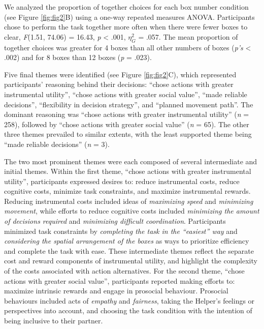 \documentclass[
  man,
  floatsintext,
  longtable,
  nolmodern,
  notxfonts,
  notimes,
  mask,
  colorlinks=true,linkcolor=blue,citecolor=blue,urlcolor=blue]{apa7}
\begin{document}
\clearpage

We analyzed the proportion of together choices for each box number
condition (see Figure \ref{fig:fig2}B) using a one-way repeated measures
ANOVA. Participants chose to perform the task together more often when
there were fewer boxes to clear, \emph{F}(1.51, 74.06) = 16.43, \emph{p}
\textless{} .001, \(\eta_{G}^{2}\) = .057. The mean proportion of
together choices was greater for 4 boxes than all other numbers of boxes
(\emph{p's} \textless{} .002) and for 8 boxes than 12 boxes (\emph{p} =
.023).

Five final themes were identified (see Figure \ref{fig:fig2}C), which
represented participants' reasoning behind their decisions: ``chose
actions with greater instrumental utility'', ``chose actions with
greater social value'', ``made reliable decisions'', ``flexibility in
decision strategy'', and ``planned movement path''. The dominant
reasoning was ``chose actions with greater instrumental utility''
(\emph{n} = 258), followed by ``chose actions with greater social
value'' (\emph{n} = 65). The other three themes prevailed to similar
extents, with the least supported theme being ``made reliable
decisions'' (\emph{n} = 3).

The two most prominent themes were each composed of several intermediate
and initial themes. Within the first theme, ``chose actions with greater
instrumental utility'', participants expressed desires to: reduce
instrumental costs, reduce cognitive costs, minimize task constraints,
and maximize instrumental rewards. Reducing instrumental costs included
ideas of \emph{maximizing speed} and \emph{minimizing movement}, while
efforts to reduce cognitive costs included \emph{minimizing the amount
of decisions required} and \emph{minimizing difficult coordination}.
Participants minimized task constraints by \emph{completing the task in
the ``easiest'' way} and \emph{considering the spatial arrangement of
the boxes} as ways to prioritize efficiency and complete the task with
ease. These intermediate themes reflect the separate cost and reward
components of instrumental utility, and highlight the complexity of the
costs associated with action alternatives. For the second theme, ``chose
actions with greater social value'', participants reported making
efforts to: maximize intrinsic rewards and engage in prosocial
behaviour. Prosocial behaviours included acts of \emph{empathy} and
\emph{fairness}, taking the Helper's feelings or perspectives into
account, and choosing the task condition with the intention of being
inclusive to their partner.
\end{document}
